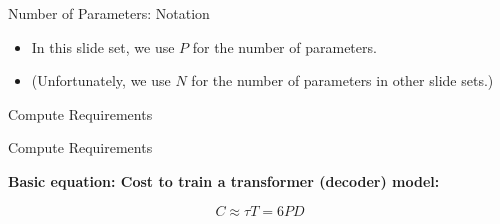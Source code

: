 \documentclass[11pt,compress,t,notes=noshow, xcolor=table]{beamer}
\begin{document}








\begin{vbframe}{Number of Parameters: Notation}

\vfill

\begin{itemize}
\item In this slide set, we use $P$ for the number of parameters.
\item (Unfortunately,  we use $N$ for the number of
  parameters in other slide sets.)
\end{itemize}

\vfill
    
\end{vbframe}

\begin{vbframe}{Compute Requirements}
\end{vbframe}
\begin{vbframe}{Compute Requirements}

\vfill

\textbf{Basic equation: Cost to train a transformer (decoder) model:}

\vspace{1.5cm}

$$C \approx \tau T = 6 P D$$ 

\vspace{1.5cm}

\centering {}

\vfill

\end{vbframe}

\end{document}
